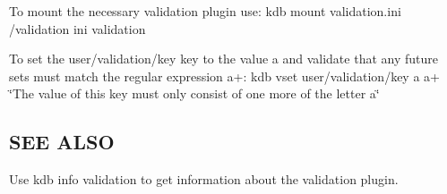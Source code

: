 To mount the necessary validation plugin use\+: {\ttfamily kdb mount validation.\+ini /validation ini validation}

To set the {\ttfamily user/validation/key} key to the value {\ttfamily a} and validate that any future sets must match the regular expression {\ttfamily a+}\+: {\ttfamily kdb vset user/validation/key a a+ \char`\"{}\+The value of this key must only consist of one more of the letter a\char`\"{}}

\subsection*{S\+E\+E A\+L\+S\+O}


\begin{DoxyItemize}
\item Use {\ttfamily kdb info validation} to get information about the validation plugin. 
\end{DoxyItemize}